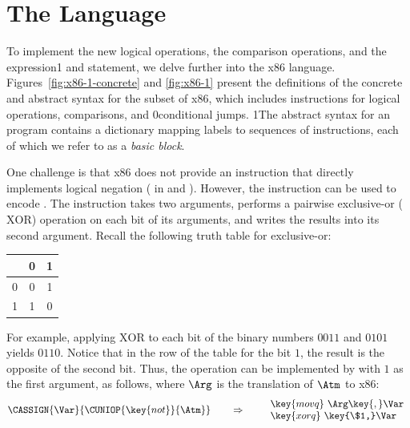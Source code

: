 \documentclass[7x10]{TimesAPriori_MIT}%
\def\racketEd{0}
\def\pythonEd{1}
\def\edition{1}
\newcommand{\racket}[1]{{\if\edition\racketEd{#1}\fi}}
\newcommand{\pythonColor}[0]{}
\newcommand{\python}[1]{{\if\edition\pythonEd\pythonColor #1\fi}}
\numberwithin{theorem}{chapter}
\numberwithin{definition}{chapter}
\numberwithin{equation}{chapter}
\begin{document}
\section{The \LangXIf{} Language}
\label{sec:x86-if}

 To implement the new logical operations, the
comparison operations, and the  expression\python{ and
  statement}, we delve further into the x86
language. Figures~\ref{fig:x86-1-concrete} and \ref{fig:x86-1} present
the definitions of the concrete and abstract syntax for the \LangXIf{}
subset of x86, which includes instructions for logical operations,
comparisons, and \racket{conditional} jumps.
%
\python{The abstract syntax for an \LangXIf{} program contains a
  dictionary mapping labels to sequences of instructions, each of
  which we refer to as a \emph{basic block}\index{subject}{basic
    block}.}

One challenge is that x86 does not provide an instruction that
directly implements logical negation ( in \LangIf{} and
\LangCIf{}).  However, the  instruction can be used to
encode .  The  instruction takes two arguments,
performs a pairwise exclusive-or ($\mathrm{XOR}$) operation on each
bit of its arguments, and writes the results into its second argument.
Recall the following truth table for exclusive-or:
\begin{center}
\begin{tabular}{l|cc}
   & 0 & 1 \\ \hline
0  & 0 & 1 \\
1  & 1 & 0
\end{tabular}
\end{center}
For example, applying $\mathrm{XOR}$ to each bit of the binary numbers
$0011$ and $0101$ yields $0110$. Notice that in the row of the table
for the bit $1$, the result is the opposite of the second bit.  Thus,
the  operation can be implemented by  with $1$ as
the first argument, as follows, where $\Arg$ is the translation of
$\Atm$ to x86:
\[
\CASSIGN{\Var}{\CUNIOP{\key{not}}{\Atm}}
\qquad\Rightarrow\qquad
\begin{array}{l}
\key{movq}~ \Arg\key{,} \Var\\
\key{xorq}~ \key{\$1,} \Var
\end{array}
\]

\newcommand{\GrammarXIf}{
\begin{array}{lcl}
  \itm{bytereg} &::=& \key{ah} \MID \key{al} \MID \key{bh} \MID \key{bl}
    \MID \key{ch} \MID \key{cl} \MID \key{dh} \MID \key{dl} \\
\Arg &::=& \key{\%}\itm{bytereg}\\
\itm{cc} & ::= & \key{e} \MID \key{ne} \MID \key{l} \MID \key{le} \MID \key{g} \MID \key{ge} \\
\Instr &::=& \key{xorq}~\Arg\key{,}~\Arg
   \MID \key{cmpq}~\Arg\key{,}~\Arg
    \MID  \key{set}cc~\Arg 
    \MID \key{movzbq}~\Arg\key{,}~\Arg \\
    &\MID& \key{j}cc~\itm{label} \\
\end{array}
}
\end{document}

